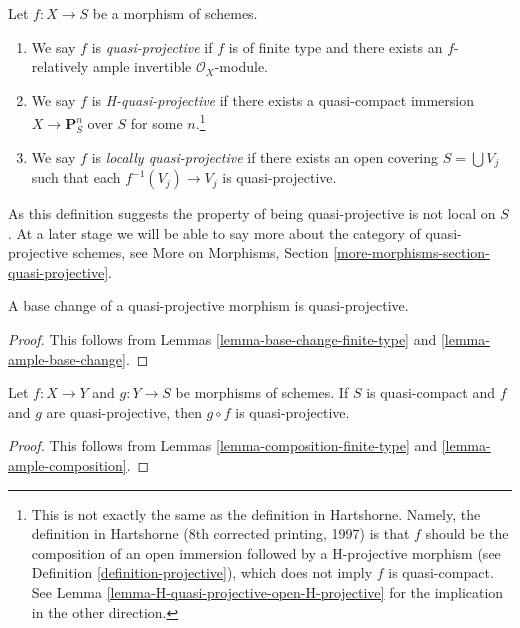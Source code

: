 \begin{definition}
\label{definition-quasi-projective}
Let $f : X \to S$ be a morphism of schemes.
\begin{enumerate}
\item We say $f$ is {\it quasi-projective} if $f$ is of finite type
and there exists an $f$-relatively ample invertible $\mathcal{O}_X$-module.
\item We say $f$ is {\it H-quasi-projective} if there exists
a quasi-compact immersion $X \to \mathbf{P}^n_S$ over $S$ for some
$n$.\footnote{This is not exactly the same as the definition in Hartshorne.
Namely, the definition in Hartshorne (8th corrected printing, 1997) is that
$f$ should be the composition of an open immersion followed by a H-projective
morphism (see Definition \ref{definition-projective}), which does not imply
$f$ is quasi-compact. See
Lemma \ref{lemma-H-quasi-projective-open-H-projective} for
the implication in the other direction.}
\item We say $f$ is {\it locally quasi-projective} if there exists
an open covering $S = \bigcup V_j$ such that each $f^{-1}(V_j) \to V_j$
is quasi-projective.
\end{enumerate}
\end{definition}

\noindent
As this definition suggests the property of being quasi-projective
is not local on $S$. At a later stage we will be able to say more
about the category of quasi-projective schemes, see
More on Morphisms, Section \ref{more-morphisms-section-quasi-projective}.

\begin{lemma}
\label{lemma-base-change-quasi-projective}
A base change of a quasi-projective morphism is quasi-projective.
\end{lemma}

\begin{proof}
This follows from
Lemmas \ref{lemma-base-change-finite-type} and
\ref{lemma-ample-base-change}.
\end{proof}

\begin{lemma}
\label{lemma-composition-quasi-projective}
Let $f : X \to Y$ and $g : Y \to S$ be morphisms of schemes.
If $S$ is quasi-compact and $f$ and $g$ are quasi-projective,
then $g \circ f$ is quasi-projective.
\end{lemma}

\begin{proof}
This follows from
Lemmas \ref{lemma-composition-finite-type} and
\ref{lemma-ample-composition}.
\end{proof}

